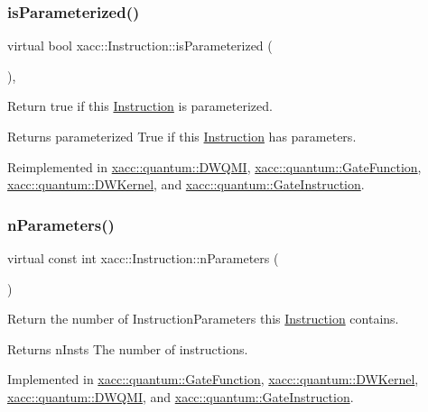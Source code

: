 \subsubsection{\texorpdfstring{is\+Parameterized()}{isParameterized()}}
{\footnotesize\ttfamily virtual bool xacc\+::\+Instruction\+::is\+Parameterized (\begin{DoxyParamCaption}{ }\end{DoxyParamCaption})\hspace{0.3cm}{\ttfamily [inline]}, {\ttfamily [virtual]}}

Return true if this \hyperlink{a01657}{Instruction} is parameterized.

\begin{DoxyReturn}{Returns}
parameterized True if this \hyperlink{a01657}{Instruction} has parameters. 
\end{DoxyReturn}


Reimplemented in \hyperlink{a01225_aee43b2e499f122dfe250b529a3f77add}{xacc\+::quantum\+::\+D\+W\+Q\+MI}, \hyperlink{a01249_afad47903e0ed55ddbfa827ef8408a94b}{xacc\+::quantum\+::\+Gate\+Function}, \hyperlink{a01221_a8957ea368244ed4a4ebd85f6bfecb785}{xacc\+::quantum\+::\+D\+W\+Kernel}, and \hyperlink{a01253_afe7aeeb398262931e156bcb3950f8188}{xacc\+::quantum\+::\+Gate\+Instruction}.

\mbox{\label{a01657_ad54585d13c04ffd20296fff7ab8107ff}} 
\subsubsection{\texorpdfstring{n\+Parameters()}{nParameters()}}
{\footnotesize\ttfamily virtual const int xacc\+::\+Instruction\+::n\+Parameters (\begin{DoxyParamCaption}{ }\end{DoxyParamCaption})\hspace{0.3cm}{\ttfamily [pure virtual]}}

Return the number of Instruction\+Parameters this \hyperlink{a01657}{Instruction} contains.

\begin{DoxyReturn}{Returns}
n\+Insts The number of instructions. 
\end{DoxyReturn}


Implemented in \hyperlink{a01249_ad0bffcbc0884d81d6bdddf55385fc6c9}{xacc\+::quantum\+::\+Gate\+Function}, \hyperlink{a01221_a029429948329b94c1d89f32cf5c486d4}{xacc\+::quantum\+::\+D\+W\+Kernel}, \hyperlink{a01225_afdfc8b852ba29c2b21c5c368098ffc4c}{xacc\+::quantum\+::\+D\+W\+Q\+MI}, and \hyperlink{a01253_a3752912b2c402668ca4814e21d4bbd26}{xacc\+::quantum\+::\+Gate\+Instruction}.

